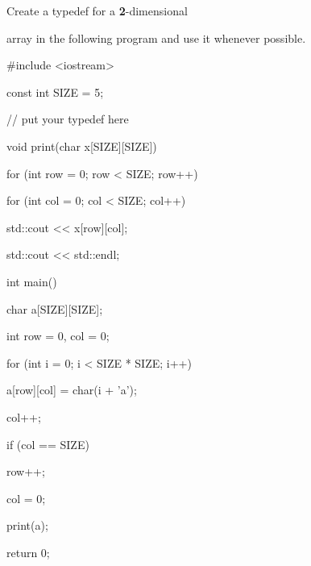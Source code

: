 Create a typedef for a \textbf{2}-dimensional

array in the following program and use it whenever possible.



\begin{consolethree}[escapeinside=||]

#include <iostream>



const int SIZE = 5;



// put your typedef here



void print(char x[SIZE][SIZE])

{

    for (int row = 0; row < SIZE; row++)

    {

        for (int col = 0; col < SIZE; col++)

        {

            std::cout << x[row][col];

        }

        std::cout << std::endl;

    }

}



int main()

{

    char a[SIZE][SIZE];



    int row = 0, col = 0;

    for (int i = 0; i < SIZE * SIZE; i++)

    {

        a[row][col] = char(i + 'a');

        col++;

        if (col == SIZE)

        {

            row++;

            col = 0;

        }

    }



    print(a);

    return 0;

}

\end{consolethree}

